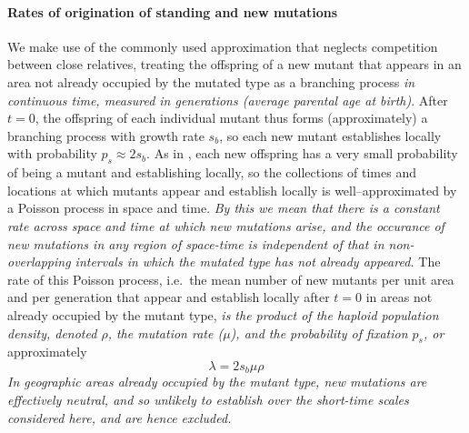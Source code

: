 \documentclass{article}
\newcommand{\gc}[1]{{\it\color{blue}#1}}
\newcommand{\plr}[1]{{\it\color{Fuchsia}#1}}
\begin{document}
\paragraph{Rates of origination of standing and new mutations}
We make use of the commonly used approximation that neglects competition between close relatives,
treating the offspring of a new mutant that appears in an area not already occupied by the mutated type
as a branching process \gc{in continuous time, measured in generations
(average parental age at birth)}. 
After $t=0$, the offspring of each individual mutant thus forms (approximately) a branching process with growth rate $s_b$,
so each new mutant establishes locally with probability $p_s \approx 2s_b$.
As in \cite{ralphcoop2010}, each new offspring has a very small probability of being a mutant and establishing locally,
so the collections of times and locations at which mutants appear and establish locally 
is well--approximated by a Poisson process in space and time.
\gc{By this we mean that there is a constant rate across space and
  time at which new
  mutations arise, and the occurance of new mutations in any region of
  space-time is independent of that in non-overlapping intervals
  in which the mutated type has not already appeared.}
The rate of this Poisson process,
i.e.\ the mean number of new mutants per unit area and per generation that
appear and establish locally after $t=0$ in areas not already occupied by the mutant type,
\plr{is the product of the haploid population density, denoted $\rho$,
the mutation rate ($\mu$),
and the probability of fixation $p_s$, or}
approximately 
\begin{equation}
\lambda = 2 s_b \mu \rho 
\end{equation}
\gc{In geographic areas already occupied by the mutant type, 
 new mutations are effectively neutral, and so unlikely to establish over the
 short-time scales considered here, and are hence excluded.  }
\end{document}
